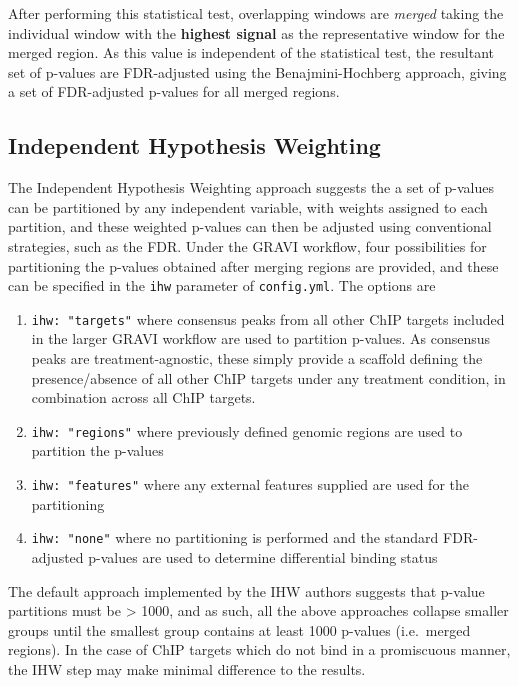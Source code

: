 \documentclass[
]{book}
\providecommand{\tightlist}{%
  \setlength{\itemsep}{0pt}\setlength{\parskip}{0pt}}
\begin{document}
After performing this statistical test, overlapping windows are \emph{merged} taking the individual window with the \textbf{highest signal} as the representative window for the merged region.
As this value is independent of the statistical test\citep{csaw}, the resultant set of p-values are FDR-adjusted using the Benajmini-Hochberg approach\citep{fdr}, giving a set of FDR-adjusted p-values for all merged regions.

\hypertarget{independent-hypothesis-weighting}{%
\subsection*{Independent Hypothesis Weighting}\label{independent-hypothesis-weighting}}

The Independent Hypothesis Weighting approach\citep{ihw} suggests the a set of p-values can be partitioned by any independent variable, with weights assigned to each partition, and these weighted p-values can then be adjusted using conventional strategies, such as the FDR.
Under the GRAVI workflow, four possibilities for partitioning the p-values obtained after merging regions are provided, and these can be specified in the \texttt{ihw} parameter of \texttt{config.yml}.
The options are

\begin{enumerate}
\def\labelenumi{\arabic{enumi}.}
\tightlist
\item
  \texttt{ihw:\ "targets"} where consensus peaks from all other ChIP targets included in the larger GRAVI workflow are used to partition p-values. As consensus peaks are treatment-agnostic, these simply provide a scaffold defining the presence/absence of all other ChIP targets under any treatment condition, in combination across all ChIP targets.
\item
  \texttt{ihw:\ "regions"} where previously defined genomic regions are used to partition the p-values
\item
  \texttt{ihw:\ "features"} where any external features supplied are used for the partitioning
\item
  \texttt{ihw:\ "none"} where no partitioning is performed and the standard FDR-adjusted p-values are used to determine differential binding status
\end{enumerate}

The default approach implemented by the IHW authors suggests that p-value partitions must be \textgreater{} 1000, and as such, all the above approaches collapse smaller groups until the smallest group contains at least 1000 p-values (i.e.~merged regions).
In the case of ChIP targets which do not bind in a promiscuous manner, the IHW step may make minimal difference to the results.
\end{document}
